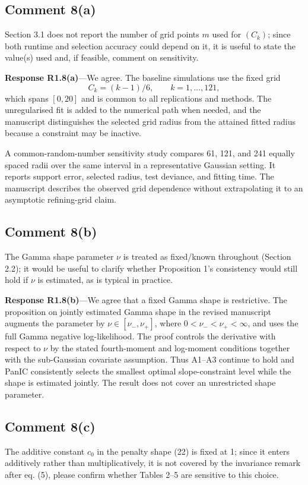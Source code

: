 \documentclass[11pt]{article}
\newcommand{\response}[1]{\par\noindent\textbf{Response #1}---}
\begin{document}
\subsection*{Comment 8(a)}
Section 3.1 does not report the number of grid points $m$ used for $(C_k)$; since both runtime and selection accuracy could depend on it, it is useful to state the value(s) used and, if feasible, comment on sensitivity.

\response{R1.8(a)}We agree. The baseline simulations use the fixed grid
\[
C_k=(k-1)/6,\qquad k=1,\ldots,121,
\]
which spans $[0,20]$ and is common to all replications and methods. The unregularised fit is added to the numerical path when needed, and the manuscript distinguishes the selected grid radius from the attained fitted radius because a constraint may be inactive.

A common-random-number sensitivity study compares 61, 121, and 241 equally spaced radii over the same interval in a representative Gaussian setting. It reports support error, selected radius, test deviance, and fitting time. The manuscript describes the observed grid dependence without extrapolating it to an asymptotic refining-grid claim.

\subsection*{Comment 8(b)}
The Gamma shape parameter $\nu$ is treated as fixed/known throughout (Section 2.2); it would be useful to clarify whether Proposition 1's consistency would still hold if $\nu$ is estimated, as is typical in practice.

\response{R1.8(b)}We agree that a fixed Gamma shape is restrictive. The proposition on jointly estimated Gamma shape in the revised manuscript augments the parameter by $\nu\in[\nu_-,\nu_+]$, where $0<\nu_-<\nu_+<\infty$, and uses the full Gamma negative log-likelihood. The proof controls the derivative with respect to $\nu$ by the stated fourth-moment and log-moment conditions together with the sub-Gaussian covariate assumption. Thus A1--A3 continue to hold and PanIC consistently selects the smallest optimal slope-constraint level while the shape is estimated jointly. The result does not cover an unrestricted shape parameter.

\subsection*{Comment 8(c)}
The additive constant $c_0$ in the penalty shape (22) is fixed at 1; since it enters additively rather than multiplicatively, it is not covered by the invariance remark after eq. (5), please confirm whether Tables 2--5 are sensitive to this choice.
\end{document}

